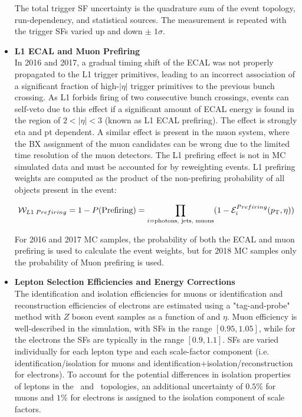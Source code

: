 \begin{itemize}
    The total trigger SF uncertainty is the quadrature sum of the event topology, run-dependency, and statistical sources.
    The measurement is repeated with the trigger SFs varied up and down $\pm \; 1 \sigma$.
    \item {\bf L1 ECAL and Muon Prefiring} \\
    In 2016 and 2017, a gradual timing shift of the ECAL was not properly propagated to the L1 trigger primitives, leading to an incorrect association of a significant fraction of high-$\vert \eta \vert$ trigger primitives to the previous bunch crossing.
    As L1 forbids firing of two consecutive bunch crossings, events can self-veto due to this effect if a significant amount of ECAL energy is found in the region of $2<\vert \eta \vert<3$ (known as L1 ECAL prefiring).
    The effect is strongly eta and pt dependent.
    A similar effect is present in the muon system, where the BX assignment of the muon candidates can be wrong due to the limited time resolution of the muon detectors. 
    The L1 prefiring effect is not in MC simulated data and must be accounted for by reweighting events.
    L1 prefiring weights are computed as the product of the non-prefiring probability of all objects present in the event:
    \begin{linenomath*}
    \begin{align}
    \mathcal{W}_{L1 \; Prefiring} = 1 - P(\text{Prefiring}) = \prod_{i=\text{photons, jets, muons}} (1 - \mathcal{E}_i^{Prefiring} (p_{\mathrm{T}},\eta))
    \end{align}
    \end{linenomath*}
    For 2016 and 2017 MC samples, the probability of both the ECAL and muon prefiring is used to calculate the event weights, but for 2018 MC samples only the probability of Muon prefiring is used.
    \item {\bf Lepton Selection Efficiencies and Energy Corrections} \\
    The identification and isolation efficiencies for muons or identification and reconstruction efficiencies of electrons are estimated using a "tag-and-probe" method with $Z$ boson event samples as a function of \pT and $\eta$. 
    Muon efficiency is well-described in the simulation, with SFs in the range $[0.95,1.05]$, while for the electrons the SFs are typically in the range $[0.9,1.1]$. 
    SFs are varied individually for each lepton type and each scale-factor component (i.e. identification/isolation for muons and identification+isolation/reconstruction for electrons). 
    To account for the potential differences in isolation properties of leptons in the \ttbar\ and \zjets\ topologies, an additional uncertainty of $0.5\%$ for muons and $1\%$ for electrons is assigned to the isolation component of scale factors.

\end{itemize}

